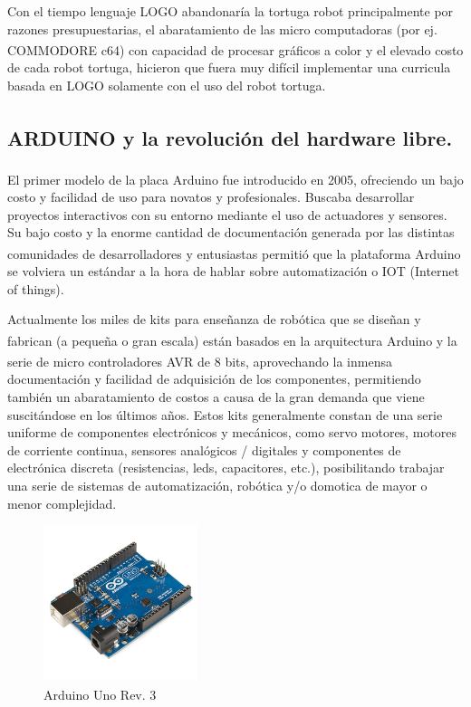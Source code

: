 Con el tiempo lenguaje LOGO abandonaría la tortuga robot principalmente por razones presupuestarias, el abaratamiento de las micro computadoras (por ej. COMMODORE\textsuperscript{\textregistered} c64) con capacidad de procesar gráficos a color y el elevado costo de cada robot tortuga, hicieron que fuera muy difícil implementar una curricula basada en LOGO solamente con el uso del robot tortuga.

\subsection{ARDUINO\textsuperscript{\texttrademark} y la revolución del hardware libre.} 


El primer modelo de la placa Arduino\textsuperscript{\texttrademark} fue introducido en 2005, ofreciendo un bajo costo y facilidad de uso para novatos y profesionales. Buscaba desarrollar proyectos interactivos con su entorno mediante el uso de actuadores y sensores. Su bajo costo y la enorme cantidad de documentación generada por las distintas comunidades de desarrolladores y entusiastas permitió que la plataforma Arduino\textsuperscript{\texttrademark} se volviera un estándar a la hora de hablar sobre automatización o IOT (Internet of things).

Actualmente los miles de kits para enseñanza de robótica que se diseñan y fabrican (a pequeña o gran escala) están basados en la arquitectura Arduino\textsuperscript{\texttrademark} y la serie de micro controladores AVR\textsuperscript{\textregistered} de 8 bits, aprovechando la inmensa documentación y facilidad de adquisición de los componentes, permitiendo también un abaratamiento de costos a causa de la gran demanda que viene suscitándose en los últimos años. Estos kits generalmente constan de una serie uniforme de componentes electrónicos y mecánicos, como servo motores, motores de corriente continua, sensores analógicos / digitales y componentes de electrónica discreta (resistencias, leds, capacitores, etc.), posibilitando trabajar una serie de sistemas de automatización, robótica y/o domotica de mayor o menor complejidad.

\begin{figure}
  \begin{center}
    \includegraphics[width=0.4\textwidth]{figuras/Arduino_Uno_-_R3.jpg}
    \caption[Caption for LOF]{Arduino\textsuperscript{\texttrademark} Uno Rev. 3}
       
    \label{fig:arduinouno }
  \end{center}
\end{figure}

